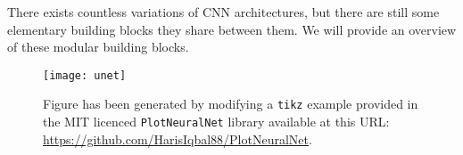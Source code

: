 There exists countless variations of CNN architectures, but there are still some elementary building blocks they share between them.
We will provide an overview of these modular building blocks.

\begin{figure}[H]
  \texttt{[image: unet]}
  \caption{%
    Figure has been generated by modifying a \texttt{tikz} example provided in the MIT licenced \texttt{PlotNeuralNet} library available at this URL:\@ \\ %
    \protect\url{https://github.com/HarisIqbal88/PlotNeuralNet}.
  }%
  \label{fig:unet}
\end{figure}
